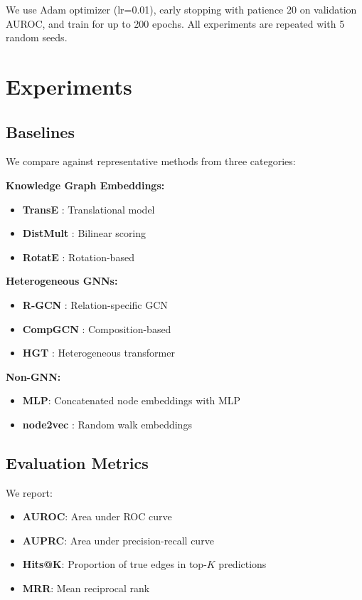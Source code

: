 \documentclass[twoside]{article}
\begin{document}
We use Adam optimizer (lr=0.01), early stopping with patience 20 on validation AUROC, and train for up to 200 epochs. All experiments are repeated with 5 random seeds.

\section{Experiments}

\subsection{Baselines}

We compare against representative methods from three categories:

\textbf{Knowledge Graph Embeddings:}
\begin{itemize}
    \item \textbf{TransE} \citep{bordes2013transe}: Translational model
    \item \textbf{DistMult} \citep{yang2015distmult}: Bilinear scoring
    \item \textbf{RotatE} \citep{sun2019rotate}: Rotation-based
\end{itemize}

\textbf{Heterogeneous GNNs:}
\begin{itemize}
    \item \textbf{R-GCN} \citep{schlichtkrull2018rgcn}: Relation-specific GCN
    \item \textbf{CompGCN} \citep{vashishth2020compgcn}: Composition-based
    \item \textbf{HGT} \citep{hu2020hgt}: Heterogeneous transformer
\end{itemize}

\textbf{Non-GNN:}
\begin{itemize}
    \item \textbf{MLP}: Concatenated node embeddings with MLP
    \item \textbf{node2vec} \citep{grover2016node2vec}: Random walk embeddings
\end{itemize}

\subsection{Evaluation Metrics}

We report:
\begin{itemize}
    \item \textbf{AUROC}: Area under ROC curve
    \item \textbf{AUPRC}: Area under precision-recall curve
    \item \textbf{Hits@K}: Proportion of true edges in top-$K$ predictions
    \item \textbf{MRR}: Mean reciprocal rank
\end{itemize}
\end{document}
